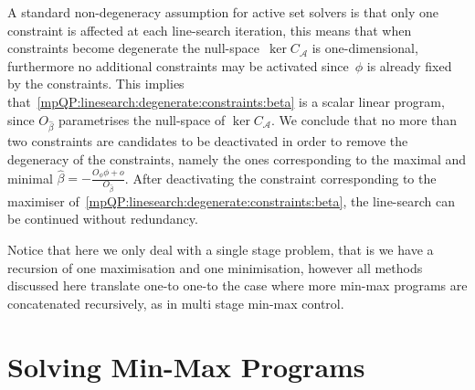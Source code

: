 \documentclass[journal]{IEEEtran}
\theoremstyle{remark}
\theoremstyle{definition}
\begin{document}
A standard non-degeneracy assumption for active set solvers is that only one constraint is affected at each line-search
iteration, this means that when constraints become degenerate the null-space~$\ker C_{\mathcal A}$ is
one-dimensional, furthermore no additional constraints may be activated since~$\phi$ is already fixed by
the constraints.
%
This implies that~\eqref{mpQP:linesearch:degenerate:constraints:beta} is a scalar linear program, since
$O_{\hat\beta}$ parametrises the null-space of $\ker C_{\mathcal A}$.
%
We conclude that no more than two constraints are candidates to be deactivated in order to remove the degeneracy
of the constraints, namely the ones corresponding to the maximal and minimal $\hat\beta=
-\frac{O_\phi\phi+o}{O_{\hat\beta}}$.
%
After deactivating the constraint corresponding to the maximiser of~\eqref{mpQP:linesearch:degenerate:constraints:beta},
the line-search can be continued without redundancy.


Notice that here we only deal with a single stage problem, that is we have a recursion of one
maximisation and one minimisation, however all methods discussed here translate one-to one-to the
case where more min-max programs are concatenated recursively, as in multi stage min-max control.
%
%
%
%
\section{Solving Min-Max Programs}\label{sec:solving:min:max:programs}
\end{document}
